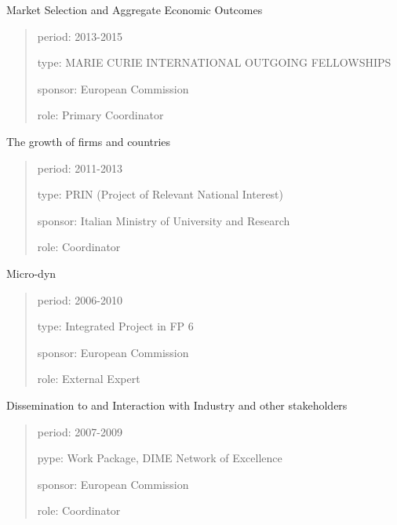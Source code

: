 \documentclass[a4paper]{article}
\newenvironment{DUfieldlist}%
    {\quote\description}
    {\enddescription\endquote}
\begin{document}
Market Selection and Aggregate Economic Outcomes
%
\begin{quote}
%
\begin{DUfieldlist}
\item[{period:}]
2013-2015

\item[{type:}]
MARIE CURIE INTERNATIONAL OUTGOING FELLOWSHIPS

\item[{sponsor:}]
European Commission

\item[{role:}]
Primary Coordinator

\end{DUfieldlist}

\end{quote}

The growth of firms and countries
%
\begin{quote}
%
\begin{DUfieldlist}
\item[{period:}]
2011-2013

\item[{type:}]
PRIN (Project of Relevant National Interest)

\item[{sponsor:}]
Italian Ministry of University and Research

\item[{role:}]
Coordinator

\end{DUfieldlist}

\end{quote}

Micro-dyn
%
\begin{quote}
%
\begin{DUfieldlist}
\item[{period:}]
2006-2010

\item[{type:}]
Integrated Project in FP 6

\item[{sponsor:}]
European Commission

\item[{role:}]
External Expert

\end{DUfieldlist}

\end{quote}

Dissemination to and Interaction with Industry and other stakeholders
%
\begin{quote}
%
\begin{DUfieldlist}
\item[{period:}]
2007-2009

\item[{pype:}]
Work Package, DIME Network of Excellence

\item[{sponsor:}]
European Commission

\item[{role:}]
Coordinator

\end{DUfieldlist}

\end{quote}
\end{document}
